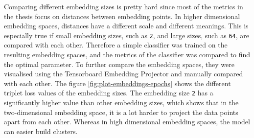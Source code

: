 \newline
Comparing different embedding sizes is pretty hard since most of the metrics in the thesis focus on distances between embedding points. In higher dimensional embedding spaces, distances have a different scale and different meanings. This is especially true if small embedding sizes, such as \texttt{2}, and large sizes, such as \texttt{64}, are compared with each other. Therefore a simple classifier was trained on the resulting embedding spaces, and the metrics of the classifier was compared to find the optimal parameter. To further compare the embedding spaces, they were visualised using the Tensorboard Embedding Projector and manually compared with each other.
\newline
\newline
The figure \ref{fig:plot-embeddings-epochs} shows the different triplet loss values of the embedding sizes. The embedding size \texttt{2} has a significantly higher value than other embedding sizes, which shows that in the two-dimensional embedding space, it is a lot harder to project the data points apart from each other. Whereas in high dimensional embedding spaces, the model can easier build clusters.
